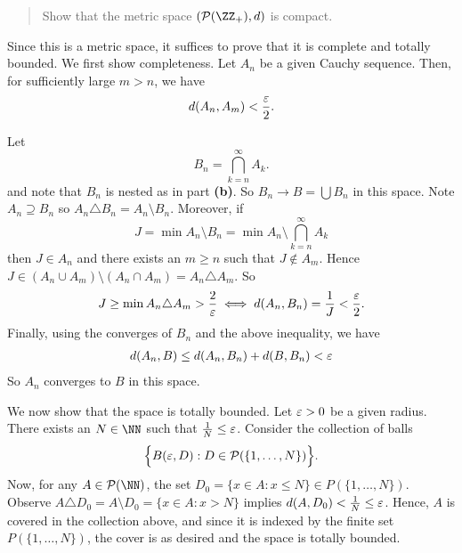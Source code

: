 \documentclass{homework}
\begin{document}
\begin{quote}
  Show that the metric space $(\mathcal P(\ZZ_+),d)$ is compact.
\end{quote}
\begin{solution}
Since this is a metric space, it suffices to prove that it is complete and
totally bounded.  We first show completeness.  Let $A_n$ be a given Cauchy
sequence.  Then, for sufficiently large $m>n$, we have 
$$d(A_n,A_m) < \frac {\varepsilon} 2.$$

Let 
$$
B_n = \bigcap_{k=n}^\infty A_k.
$$
and note that $B_n$ is nested as in part {\bf (b)}.  So $B_n \to B = \bigcup B_n$ in this space.  
Note $A_n \supseteq B_n$ so $A_n \triangle B_n = A_n \setminus B_n$.  Moreover, if 
$$
  J = \min A_n\setminus B_n = \min A_n \setminus \bigcap_{k=n}^\infty A_k
$$
then $J \in A_n$ and there exists an $m\ge n$ such that $J \not\in A_m$.  Hence
$ J \in (A_n \cup A_m) \setminus (A_n \cap A_m) = A_n \triangle A_m$.  So 
$$
  J \ge \min A_n\triangle A_m > \frac 2{\varepsilon} \iff d(A_n,B_n) = \frac 1J < \frac{\varepsilon}2. 
$$
Finally, using the converges of $B_n$ and the above inequality, we have
\begin{align*}
  d(A_n,B) \le d(A_n,B_n) + d(B,B_n) < \varepsilon
\end{align*}
So $A_n$ converges to $B$ in this space.

We now show that the space is totally bounded.  Let $\varepsilon > 0$ be a given
radius.  There exists an $N\in \NN$ such that $\frac 1N \le \varepsilon$.  Consider
the collection of balls 
$$
  \Big\{ B(\varepsilon,D): D\in\mathcal P(\{1,\dots,N\})\Big\}.
$$
Now, for any $A \in \mathcal P(\NN)$, the set $D_0=\{x\in A: x \le N\} \in P(\{1,\dots,N\})$.  Observe
$A \triangle D_0 = A\setminus D_0 = \{x\in A: x > N\}$ implies $d(A,D_0) < \frac 1N \le \varepsilon$.  Hence,
$A$ is covered in the collection above, and since it is indexed by the finite set $P(\{1,\dots,N\})$, the
cover is as desired and the space is totally bounded.


\end{solution}
\end{document}
